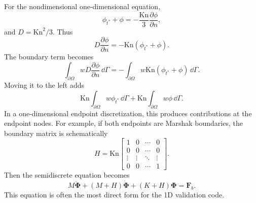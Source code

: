 \documentclass[11pt]{article}
\begin{document}
For the nondimensional one-dimensional equation,
\begin{equation}
    \phi_{t^*}+\phi=-\frac{\mathrm{Kn}}{3}\frac{\partial\phi}{\partial n},
\end{equation}
and \(D=\mathrm{Kn}^2/3\). Thus
\begin{equation}
    D\frac{\partial\phi}{\partial n}
    =-\mathrm{Kn}(\phi_{t^*}+\phi).
\end{equation}
The boundary term becomes
\begin{equation}
    \int_{\partial\Omega}wD\frac{\partial\phi}{\partial n}\,\dd\Gamma
    =-\int_{\partial\Omega}w\mathrm{Kn}(\phi_{t^*}+\phi)\,\dd\Gamma.
\end{equation}
Moving it to the left adds
\begin{equation}
    \mathrm{Kn}\int_{\partial\Omega}w\phi_{t^*}\,\dd\Gamma
    +\mathrm{Kn}\int_{\partial\Omega}w\phi\,\dd\Gamma.
\end{equation}
In a one-dimensional endpoint discretization, this produces contributions at the endpoint nodes. For example, if both endpoints are Marshak boundaries, the boundary matrix is schematically
\begin{equation}
    H=\mathrm{Kn}
    \begin{bmatrix}
    1 & 0 & \cdots & 0\\
    0 & 0 & \cdots & 0\\
    \vdots & \vdots & \ddots & \vdots\\
    0 & 0 & \cdots & 1
    \end{bmatrix}.
\end{equation}
Then the semidiscrete equation becomes
\begin{equation}
    \boxed{
    M\ddot{\bm{\Phi}}+(M+H)\dot{\bm{\Phi}}+(K+H)\bm{\Phi}=\bm{F}_b.}
    \label{eq:marshak_semidiscrete_1d}
\end{equation}
This equation is often the most direct form for the 1D validation code.
\end{document}
